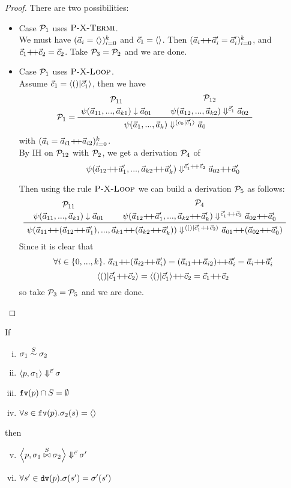 \begin{proof}
\def\cc{\c_1 {\++} \c_2}
\def\aap#1{\a_{#1} {\++} \a_{#1}'}
\def\zk#1{(#1)^k_{i=0}}

	There are two possibilities: 
	\begin{itemize}
		\item Case $\mathcal{P}_1$ uses $\textsc{P-X-Termi}$.\\
		We must have $\zk{\a_i=\emptyv}$ and $\vec c_1 = \langle \rangle$.
		Then $\zk{\aap{i} = \a_i'}$, and $\cc = \c_2 $. Take $\mathcal{P}_3
		= \mathcal{P}_2$ and we are done. \\
		
		\item Case $\mathcal{P}_1$ uses $\textsc{P-X-Loop}$. \\
	   Assume $\c_1 = \<() | \c_1' \'>$, then we have 
		$$
		\PT{
			\UCN{\MP_{11}}{\block{\a_{11}}{\a_{k1}}{\a_{01}}}
			\UCN{\MP_{12}}{\sevalf{\a_{12}}{\a_{k2}}{\c_1'}{\a_{02}}}
 			\LeLa{\MP_1 = }
			\BC{\sevalf{\a_1}{\a_k}{\< c_0 | \c_1' \'>}{\a_0}}
		}$$
	    with $\zk{\a_i = \vapp{\a_{i1}}{\a_{i2}}}$.\\
	    
	    By IH on $\mathcal{P}_{12}$ with $\mathcal{P}_2$, we get a derivation $\mathcal{P}_4$ of 
	    $$\sevalfg{\lcall}{\a_{12} {\++} \a_1',...,\a_{k2} {\++} \a_k'}{\c_1' {\++} \c_2 }{\a_{02} {\++} \a_0'}$$
	    
	    Then using the rule $\textsc{P-X-Loop}$ we can build a derivation $\mathcal{P}_5$ as follows:
	    	$$
	    \PT{
	    	\UCN{\MP_{11}}{\block{\a_{11}}{\a_{k1}}{\a_{01}}}
	    	\UCN{\MP_{4}}{\sevalfg{\lcall}{\a_{12} {\++} \a_1',...,\a_{k2} {\++} \a_k'}{\c_1' {\++} \c_2 }{\a_{02} {\++} \a_0'}}
	    	\BC{\sevalf{\a_{11} {\++} {(\a_{12} {\++} \a_1')}}
	    		        {\a_{k1} {\++} {(\a_{k2} {\++} \a_k')}}
	    		        {\< () | \c_1' {\++} \c_2 \'>}
	    		        {\a_{01} {\++} {(\a_{02} {\++} \a_0')}}}
	    }$$
	    Since it is clear that 
	    $$\forall i \in \{0,...,k\}. \ \a_{i1} {\++} (\a_{i2} {\++} \a_i') = (\a_{i1} {\++} \a_{i2}) {\++} \a_i' = \a_i {\++} \a_i' $$
	    $$ \< () | \c_1' {\++} \c_2 \'> = \< () | \c_1' \'> {\++} \c_2 = \c_1 {\++} \c_2 $$
	    so take $\mathcal{P}_3 = \mathcal{P}_5$ and we are done. 
	    
	\end{itemize}
	
\end{proof}

\begin{lem} \label{lem-emp-join}
	If 
	\begin{enumerate} [(i)]
		\item $\sigma_1 \stackrel{S}{\sim} \sigma_2$
		\item $\left\langle p,\sigma_1 \right\rangle \Downarrow^{\vec c} \sigma$
		\item $\mathtt{fv}(p) \cap S = \emptyset$
		\item $\forall s \in \mathtt{fv}(p). \sigma_2(s) = \langle \rangle$
	\end{enumerate}
	then 
	\begin{enumerate}[(i)]
		\setcounter{enumi}{4}
		\item $\left\langle p,\sigma_1 \stackrel{S}{\bowtie} \sigma_2 \right\rangle \Downarrow^{\vec c} \sigma'$
		\item $\forall s' \in \mathtt{dv}(p). \sigma(s') = \sigma'(s')$
	\end{enumerate}
\end{lem}

